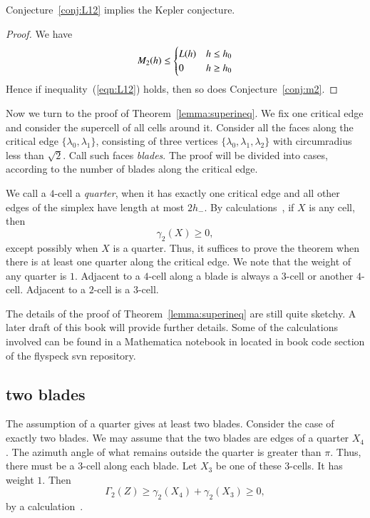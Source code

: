\begin{corollary} Conjecture~\ref{conj:L12} implies the
Kepler conjecture.
\end{corollary}

\begin{proof}
We have 
$$
 M_2(h) \le \begin{cases} L(h) & h \le {h_0}\\ 0 & h\ge {h_0} \end{cases}
$$
Hence if inequality~(\ref{eqn:L12}) holds, then so does Conjecture~\ref{conj:m2}.
\end{proof}



Now we turn to the proof of Theorem~\ref{lemma:superineq}. We fix one critical edge and consider the supercell of all cells around it.  Consider all the faces along the critical edge $\{\lambda_0,\lambda_1\}$, consisting of three vertices $\{\lambda_0,\lambda_1,\lambda_2\}$ with circumradius less than $\sqrt2$.  Call such faces {\it blades}.  The proof will be divided into cases, according to the number of blades along the critical edge.

We call a $4$-cell a {\it quarter}, when it has exactly one critical edge and all other edges of the simplex have length at most $2 h_-$. By calculations~\cite[cc:qtr]{hales:2009:nonlinear}, if $X$ is any cell, then %
$$
 \gamma_2(X) \ge 0,
$$ 
except possibly when $X$ is a quarter.  Thus, it
suffices to prove the theorem
when there is at least one quarter along the critical
edge.  We note that the weight of any quarter is $1$.
Adjacent to a $4$-cell along a blade is always a $3$-cell or another $4$-cell. Adjacent to a $2$-cell is a $3$-cell.

\begin{note}%
The details of the proof of Theorem~\ref{lemma:superineq} are still quite sketchy.  A later draft of this book will provide further details.  Some of the calculations involved can be found in a Mathematica notebook in located in book code section of the flyspeck svn repository.
\end{note}


\subsection{two blades}

The assumption of a quarter gives at least two blades.  Consider
the case of exactly two blades.
We may assume that the two blades are edges of a quarter
$X_4$. 
The azimuth angle of what remains outside the quarter
is greater than $\pi$.  Thus, there must be a $3$-cell
along each blade.  Let $X_3$ be one of these $3$-cells.
It has weight $1$.
Then $$\Gamma_2(Z)\ge \gamma_2(X_4)+\gamma_2(X_3)\ge 0,$$
by a calculation~\cite[cc:2bl]{hales:2009:nonlinear}. %

